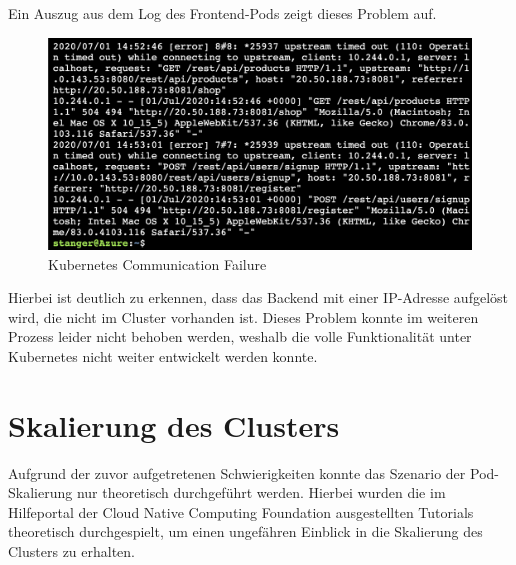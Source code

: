 Ein Auszug aus dem Log des Frontend-Pods zeigt dieses Problem auf.

\begin{figure}[h!]
 \centering
 \includegraphics[width=150mm]{images/kubernetes-failure.png}
 \caption{Kubernetes Communication Failure}
 \label{fig:kubernetes-failure}
\end{figure}

Hierbei ist deutlich zu erkennen, dass das Backend mit einer IP-Adresse aufgelöst wird, die nicht im Cluster vorhanden ist. Dieses Problem konnte im weiteren Prozess leider nicht behoben werden, weshalb die volle Funktionalität unter Kubernetes nicht weiter entwickelt werden konnte.

\section{Skalierung des Clusters}
Aufgrund der zuvor aufgetretenen Schwierigkeiten konnte das Szenario der Pod-Skalierung nur theoretisch durchgeführt werden. Hierbei wurden die im Hilfeportal der Cloud Native Computing Foundation ausgestellten Tutorials theoretisch durchgespielt, um einen ungefähren Einblick in die Skalierung des Clusters zu erhalten.